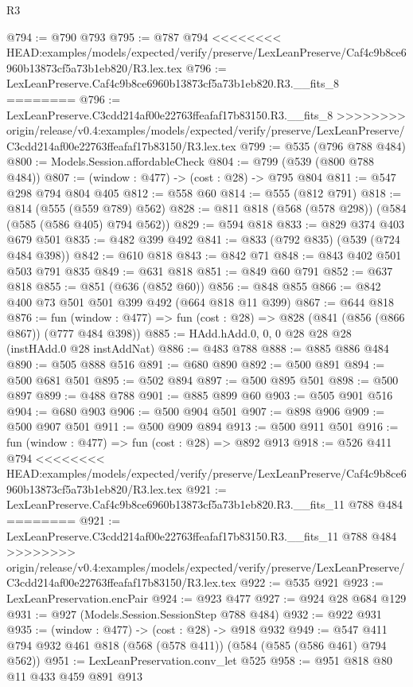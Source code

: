 \begin{lexlean}{R3}
\begin{coremodule}
{{{{{{{{{{{{{{{{{{{{{{{{{{@794 := @790 @793
@795 := @787 @794
<<<<<<<< HEAD:examples/models/expected/verify/preserve/LexLeanPreserve/Caf4c9b8ce6960b13873cf5a73b1eb820/R3.lex.tex
@796 := LexLeanPreserve.Caf4c9b8ce6960b13873cf5a73b1eb820.R3.__fits_8
========
@796 := LexLeanPreserve.C3cdd214af00e22763ffeafaf17b83150.R3.__fits_8
>>>>>>>> origin/release/v0.4:examples/models/expected/verify/preserve/LexLeanPreserve/C3cdd214af00e22763ffeafaf17b83150/R3.lex.tex
@799 := @535 (@796 @788 @484)
@800 := Models.Session.affordableCheck
@804 := @799 (@539 (@800 @788 @484))
@807 := (window : @477) -> (cost : @28) -> @795 @804
@811 := @547 @298 @794 @804 @405
@812 := @558 @60
@814 := @555 (@812 @791)
@818 := @814 (@555 (@559 @789) @562)
@828 := @811 @818 (@568 (@578 @298)) (@584 (@585 (@586 @405) @794 @562))
@829 := @594 @818
@833 := @829 @374 @403 @679 @501
@835 := @482 @399 @492
@841 := @833 (@792 @835) (@539 (@724 @484 @398))
@842 := @610 @818
@843 := @842 @71
@848 := @843 @402 @501 @503 @791 @835
@849 := @631 @818
@851 := @849 @60 @791
@852 := @637 @818
@855 := @851 (@636 (@852 @60))
@856 := @848 @855
@866 := @842 @400 @73 @501 @501 @399 @492 (@664 @818 @11 @399)
@867 := @644 @818
@876 := fun (window : @477) => fun (cost : @28) => @828 (@841 (@856 (@866 @867)) (@777 @484 @398))
@885 := HAdd.hAdd.{0, 0, 0} @28 @28 @28 (instHAdd.{0} @28 instAddNat)
@886 := @483 @788
@888 := @885 @886 @484
@890 := @505 @888 @516
@891 := @680 @890
@892 := @500 @891
@894 := @500 @681 @501
@895 := @502 @894
@897 := @500 @895 @501
@898 := @500 @897
@899 := @488 @788
@901 := @885 @899 @60
@903 := @505 @901 @516
@904 := @680 @903
@906 := @500 @904 @501
@907 := @898 @906
@909 := @500 @907 @501
@911 := @500 @909 @894
@913 := @500 @911 @501
@916 := fun (window : @477) => fun (cost : @28) => @892 @913
@918 := @526 @411 @794
<<<<<<<< HEAD:examples/models/expected/verify/preserve/LexLeanPreserve/Caf4c9b8ce6960b13873cf5a73b1eb820/R3.lex.tex
@921 := LexLeanPreserve.Caf4c9b8ce6960b13873cf5a73b1eb820.R3.__fits_11 @788 @484
========
@921 := LexLeanPreserve.C3cdd214af00e22763ffeafaf17b83150.R3.__fits_11 @788 @484
>>>>>>>> origin/release/v0.4:examples/models/expected/verify/preserve/LexLeanPreserve/C3cdd214af00e22763ffeafaf17b83150/R3.lex.tex
@922 := @535 @921
@923 := LexLeanPreservation.encPair
@924 := @923 @477
@927 := @924 @28 @684 @129
@931 := @927 (Models.Session.SessionStep @788 @484)
@932 := @922 @931
@935 := (window : @477) -> (cost : @28) -> @918 @932
@949 := @547 @411 @794 @932 @461 @818 (@568 (@578 @411)) (@584 (@585 (@586 @461) @794 @562))
@951 := LexLeanPreservation.conv_let @525
@958 := @951 @818 @80 @11 @433 @459 @891 @913
}}}}}}}}}}}}}}}}}}}}}}}}}}
\end{coremodule}
\end{lexlean}
